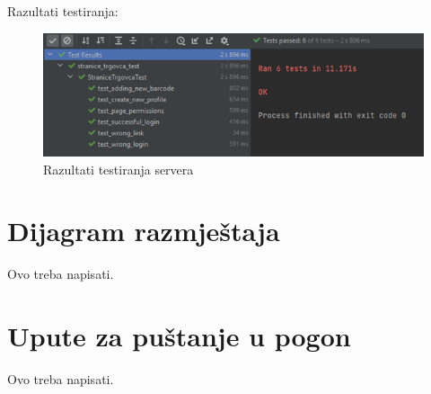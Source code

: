 			Razultati testiranja:
			\begin{figure}[H]
				\centering
				\includegraphics{slike/serverTest.png}
				\caption{Razultati testiranja servera}
				\label{fig:test_server}
			\end{figure}
		\eject
	\section{Dijagram razmještaja}
		Ovo treba napisati.
		\eject
	\section{Upute za puštanje u pogon}
		Ovo treba napisati.
		\eject
			